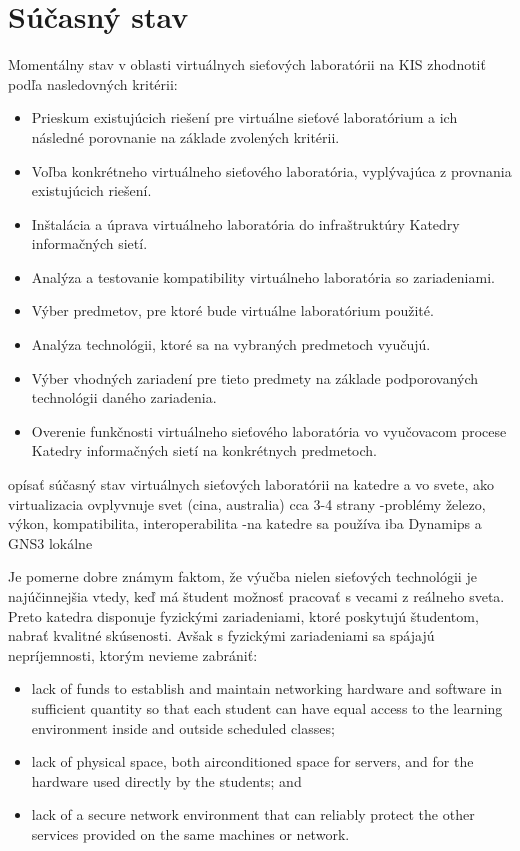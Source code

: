 \chapter{Súčasný stav}

Momentálny stav v oblasti virtuálnych sieťových laboratórii na KIS zhodnotiť podľa nasledovných kritérii:

\begin{itemize}
    \item Prieskum existujúcich riešení pre virtuálne sieťové laboratórium a ich následné porovnanie na základe zvolených kritérii.
    \item Voľba konkrétneho virtuálneho sieťového laboratória, vyplývajúca z provnania existujúcich riešení.
    \item Inštalácia a úprava virtuálneho laboratória do infraštruktúry Katedry informačných sietí.
    \item Analýza a testovanie kompatibility virtuálneho laboratória so zariadeniami.
    \item Výber predmetov, pre ktoré bude virtuálne laboratórium použité.
    \item Analýza technológii, ktoré sa na vybraných predmetoch vyučujú.
    \item Výber vhodných zariadení pre tieto predmety na základe podporovaných technológii daného zariadenia.
    \item Overenie funkčnosti virtuálneho sieťového laboratória vo vyučovacom procese Katedry informačných sietí na konkrétnych predmetoch.
\end{itemize}

opísať súčasný stav virtuálnych sieťových laboratórii na katedre a vo svete, ako virtualizacia ovplyvnuje svet (cina, australia) cca 3-4 strany
    -problémy železo, výkon, kompatibilita, interoperabilita
    -na katedre sa používa iba Dynamips a GNS3 lokálne

Je pomerne dobre známym faktom, že výučba nielen sieťových technológii je najúčinnejšia vtedy, keď má študent možnosť pracovať s vecami z reálneho sveta. Preto katedra disponuje fyzickými zariadeniami, ktoré poskytujú študentom, nabrať kvalitné skúsenosti. Avšak s fyzickými zariadeniami sa spájajú nepríjemnosti, ktorým nevieme zabrániť:

\begin{itemize}
    \item lack of funds to establish and maintain networking hardware and software in sufficient quantity so that each student can have equal access to the learning environment inside and outside scheduled classes;
    \item lack of physical space, both airconditioned space for servers, and for the hardware 
used directly by the students; and 
    \item lack of a secure network environment that can reliably protect the other services provided on the same machines or network.
\end{itemize}

